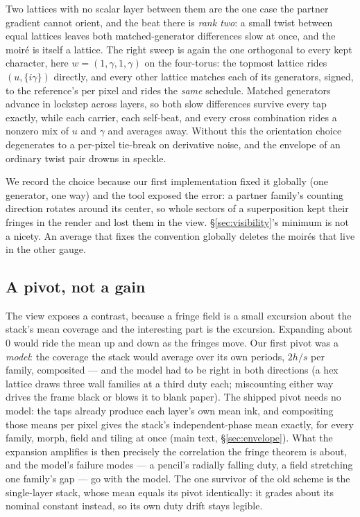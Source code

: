Two lattices with no scalar layer between them are the one case the partner
gradient cannot orient, and the beat there is \emph{rank two}: a small twist
between equal lattices leaves both matched-generator differences slow at once,
and the moir\'e is itself a lattice. The right sweep is again the one
orthogonal to every kept character, here $w=(1,\gamma,1,\gamma)$ on the
four-torus: the topmost lattice rides $(u,\{i\gamma\})$ directly, and every
other lattice matches each of its generators, signed, to the reference's per
pixel and rides the \emph{same} schedule. Matched generators advance in
lockstep across layers, so both slow differences survive every tap exactly,
while each carrier, each self-beat, and every cross combination rides a nonzero
mix of $u$ and $\gamma$ and averages away. Without this the orientation choice
degenerates to a per-pixel tie-break on derivative noise, and the envelope of
an ordinary twist pair drowns in speckle.

We record the choice because our first implementation fixed it globally (one
generator, one way) and the tool exposed the error: a partner family's counting
direction rotates around its center, so whole sectors of a superposition kept
their fringes in the render and lost them in the view. \S\ref{sec:visibility}'s minimum is not a
nicety. An average that fixes the convention globally deletes the moir\'es that
live in the other gauge.

\subsection{A pivot, not a gain}

The view exposes a contrast, because a fringe field is a small excursion about
the stack's mean coverage and the interesting part is the excursion. Expanding
about $0$ would ride the mean up and down as the fringes move. Our first pivot
was a \emph{model}: the coverage the stack would average over its own periods,
$2h/s$ per family, composited — and the model had to be right in both
directions (a hex lattice draws three wall families at a third duty each;
miscounting either way drives the frame black or blows it to blank paper).
The shipped pivot needs no model: the taps already produce each layer's own
mean ink, and compositing those means per pixel gives the stack's
independent-phase mean exactly, for every family, morph, field and tiling at
once (main text, \S\ref{sec:envelope}). What the expansion amplifies is then
precisely the correlation the fringe theorem is about, and the model's
failure modes — a pencil's radially falling duty, a field stretching one
family's gap — go with the model. The one survivor of the old scheme is the
single-layer stack, whose mean equals its pivot identically: it grades about
its nominal constant instead, so its own duty drift stays legible.

